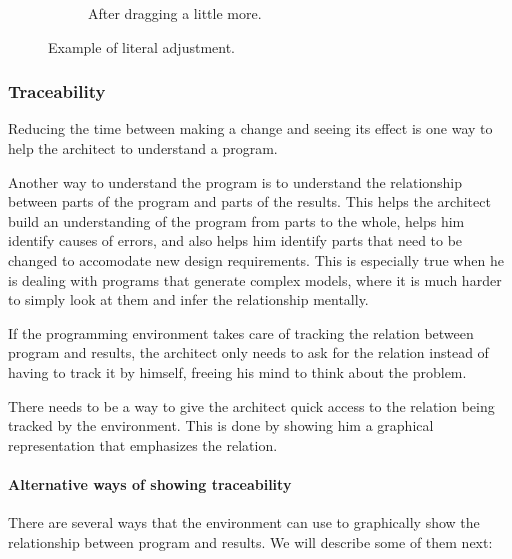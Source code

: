 \begin{figure}
\begin{subfigure}[b]{0.3\linewidth}
    \caption{After dragging a little more.}
  \end{subfigure}
  \caption{Example of literal adjustment.}
  \label{fig:lit:adjust}
\end{figure}


\subsubsection{Traceability}
\label{sec:traceability}
Reducing the time between making a change and seeing its effect is one way to help the architect to understand a program.

Another way to understand the program is to understand the relationship between parts of the program and parts of the results.
This helps the architect build an understanding of the program from parts to the whole, helps him identify causes of errors, and also helps him identify parts that need to be changed to accomodate new design requirements.
This is especially true when he is dealing with programs that generate complex models, where it is much harder to simply look at them and infer the relationship mentally.

If the programming environment takes care of tracking the relation between program and results, the architect only needs to ask for the relation instead of having to track it by himself, freeing his mind to think about the problem.

There needs to be a way to give the architect quick access to the relation being tracked by the environment.
This is done by showing him a graphical representation that emphasizes the relation.

\paragraph{Alternative ways of showing traceability}
There are several ways that the environment can use to graphically show the relationship between program and results.
We will describe some of them next:

